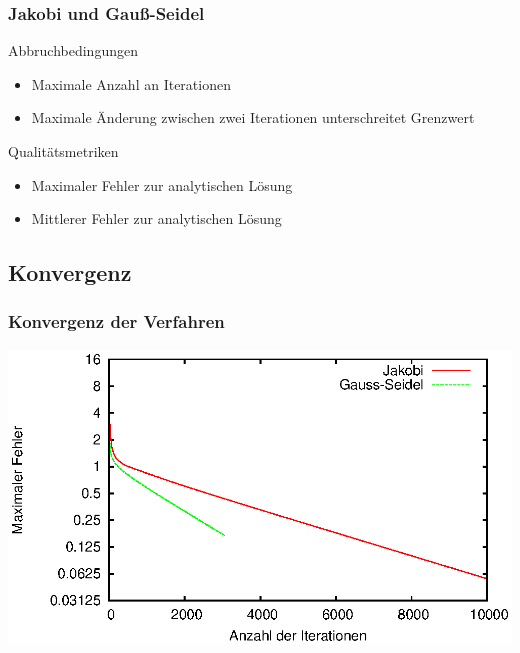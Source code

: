 \documentclass{beamer}
\begin{document}
\begin{frame}
    \frametitle{Jakobi und Gauß-Seidel}
    \begin{block}{Abbruchbedingungen}
        \begin{itemize}
            \item Maximale Anzahl an Iterationen
            \item Maximale Änderung zwischen zwei Iterationen unterschreitet Grenzwert
        \end{itemize}
    \end{block}
    \begin{block}{Qualitätsmetriken}
        \begin{itemize}
            \item Maximaler Fehler zur analytischen Lösung
            \item Mittlerer Fehler zur analytischen Lösung
        \end{itemize}
    \end{block}
\end{frame}

\subsection{Konvergenz}
\begin{frame}
    \frametitle{Konvergenz der Verfahren}
    \includegraphics[width=\textwidth]{fehlerpresentation}
\end{frame}
\end{document}
